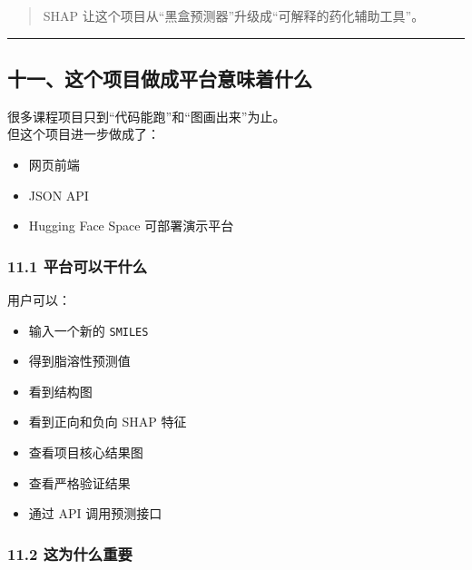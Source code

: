 \documentclass[
  ,
]{ctexart}
\providecommand{\tightlist}{%
  \setlength{\itemsep}{0pt}\setlength{\parskip}{0pt}}
\begin{document}
\begin{quote}
SHAP 让这个项目从``黑盒预测器''升级成``可解释的药化辅助工具''。
\end{quote}

\begin{center}\rule{0.5\linewidth}{0.5pt}\end{center}

\hypertarget{ux5341ux4e00ux8fd9ux4e2aux9879ux76eeux505aux6210ux5e73ux53f0ux610fux5473ux7740ux4ec0ux4e48}{%
\subsection{十一、这个项目做成平台意味着什么}\label{ux5341ux4e00ux8fd9ux4e2aux9879ux76eeux505aux6210ux5e73ux53f0ux610fux5473ux7740ux4ec0ux4e48}}

很多课程项目只到``代码能跑''和``图画出来''为止。\\
但这个项目进一步做成了：

\begin{itemize}
\tightlist
\item
  网页前端
\item
  JSON API
\item
  Hugging Face Space 可部署演示平台
\end{itemize}

\hypertarget{ux5e73ux53f0ux53efux4ee5ux5e72ux4ec0ux4e48}{%
\subsubsection{11.1
平台可以干什么}\label{ux5e73ux53f0ux53efux4ee5ux5e72ux4ec0ux4e48}}

用户可以：

\begin{itemize}
\tightlist
\item
  输入一个新的 \texttt{SMILES}
\item
  得到脂溶性预测值
\item
  看到结构图
\item
  看到正向和负向 SHAP 特征
\item
  查看项目核心结果图
\item
  查看严格验证结果
\item
  通过 API 调用预测接口
\end{itemize}

\hypertarget{ux8fd9ux4e3aux4ec0ux4e48ux91cdux8981}{%
\subsubsection{11.2
这为什么重要}\label{ux8fd9ux4e3aux4ec0ux4e48ux91cdux8981}}
\end{document}
